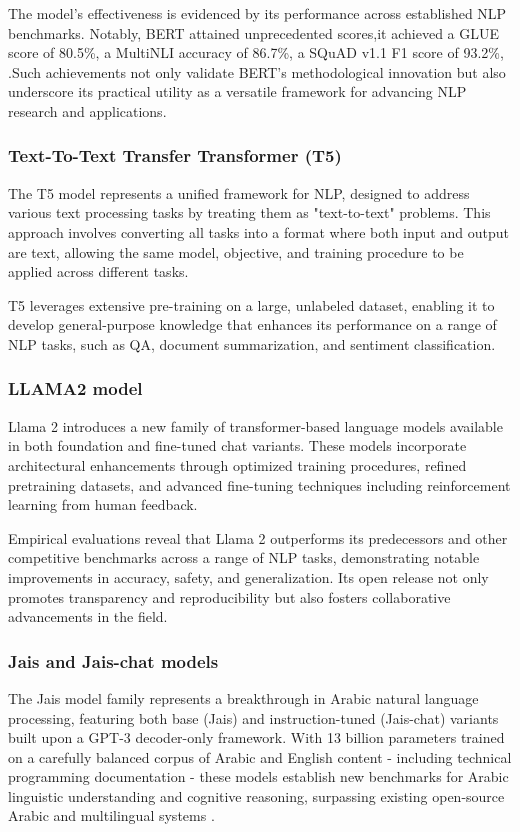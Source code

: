 	 The model’s effectiveness is evidenced by its performance across established NLP benchmarks. Notably, BERT attained unprecedented scores,it achieved a GLUE score of 80.5\%, a MultiNLI accuracy of 86.7\%, a SQuAD v1.1 F1 score of 93.2\%,  \citep{devlin2019bert}.Such achievements not only validate BERT’s methodological innovation but also underscore its practical utility as a versatile framework for advancing NLP research and applications.
	  
	  
	 \subsubsection{Text-To-Text Transfer Transformer (T5)}
	 The T5 model represents a unified framework for NLP, designed to address various text processing tasks by treating them as "text-to-text" problems. This approach involves converting all tasks into a format where both input and output are text, allowing the same model, objective, and training procedure to be applied across different tasks\citep{raffel2023exploring}.
	 
	 T5 leverages extensive pre-training on a large, unlabeled dataset, enabling it to develop general-purpose knowledge that enhances its performance on a range of NLP tasks, such as QA, document summarization, and sentiment classification.
	 \subsubsection{LLAMA2 model}
	  Llama 2 introduces a new family of transformer-based language models available in both foundation and fine-tuned chat variants. These models incorporate architectural enhancements through optimized training procedures, refined pretraining datasets, and advanced fine-tuning techniques including reinforcement learning from human feedback. 
	  
	  Empirical evaluations reveal that Llama 2 outperforms its predecessors and other competitive benchmarks across a range of NLP tasks, demonstrating notable improvements in accuracy, safety, and generalization\citep{touvron2023llama2openfoundation}. Its open release not only promotes transparency and reproducibility but also fosters collaborative advancements in the field.
	 
   \subsubsection{Jais and Jais-chat models}
The Jais model family represents a breakthrough in Arabic natural language processing, featuring both base (Jais) and instruction-tuned (Jais-chat) variants built upon a GPT-3 decoder-only framework. With 13 billion parameters trained on a carefully balanced corpus of Arabic and English content - including technical programming documentation - these models establish new benchmarks for Arabic linguistic understanding and cognitive reasoning, surpassing existing open-source Arabic and multilingual systems \citep{sengupta2023jais}.

